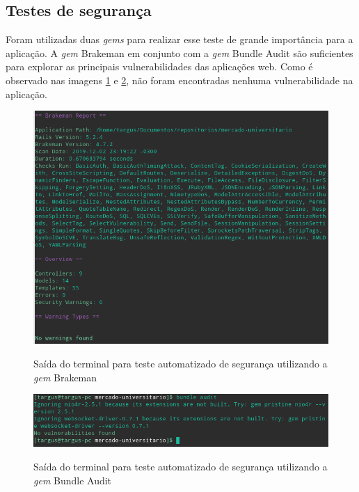 \subsection{Testes de segurança}
Foram utilizadas duas \textit{gems} para realizar esse teste de grande importância para a aplicação. A \textit{gem} Brakeman em conjunto com a \textit{gem} Bundle Audit são suficientes para explorar as principais vulnerabilidades das aplicações web. Como é observado nas imagens \ref{fig:brakeman} e \ref{fig:audit}, não foram encontradas nenhuma vulnerabilidade na aplicação.
\begin{figure}[htbp!]
  \centering
  \caption{Saída do terminal para teste automatizado de segurança utilizando a \textit{gem} Brakeman}
  \includegraphics[width=1\textwidth]{figs/brakeman.png}
    \label{fig:brakeman}
\end{figure}
\begin{figure}[htbp!]
  \centering
  \caption{Saída do terminal para teste automatizado de segurança utilizando a \textit{gem} Bundle Audit}
  \includegraphics[width=1\textwidth]{figs/bundle_audit.png}
    \label{fig:audit}
\end{figure}
